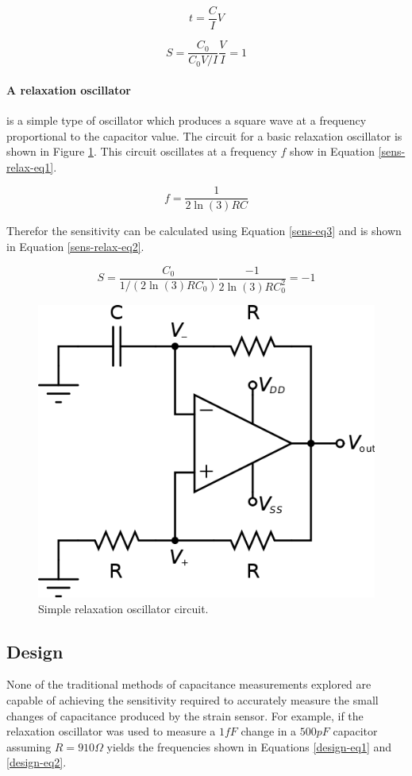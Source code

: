 \begin{equation}
	t=\frac{C}{I}V\label{sens-ctm-eq1}
\end{equation}

\begin{equation}
	S=\frac{C_0}{C_0V/I}\frac{V}{I}=1\label{sens-ctm-eq2}
\end{equation}

\paragraph{A relaxation oscillator} 
is a simple type of oscillator which produces a square wave at a frequency proportional to the capacitor value.  The circuit for a basic relaxation oscillator is shown in Figure \ref{simp-relax-osc}.  This circuit oscillates at a frequency $f$ show in Equation \ref{sens-relax-eq1}.

\begin{equation}
	f=\frac{1}{2\ln(3)RC}\label{sens-relax-eq1}
\end{equation} 

Therefor the sensitivity can be calculated using Equation \ref{sens-eq3} and is shown in Equation \ref{sens-relax-eq2}.

\begin{equation}
	S=\frac{C_0}{1/(2\ln(3)RC_0)}\frac{-1}{2\ln(3)RC_0^2}=-1\label{sens-relax-eq2}
\end{equation}

\begin{figure}
	\begin{center}
		\includegraphics[width=.6\textwidth]{Images/RelaxationOsc.png}
		\caption{Simple relaxation oscillator circuit.\label{simp-relax-osc}}
	\end{center}
\end{figure}

\subsection{Design}
None of the traditional methods of capacitance measurements explored are capable of achieving the sensitivity required to accurately measure the small changes of capacitance produced by the strain sensor.  For example, if the relaxation oscillator was used to measure a $1fF$ change in a $500pF$ capacitor assuming $R=910\Omega$ yields the frequencies shown in Equations \ref{design-eq1} and \ref{design-eq2}.

